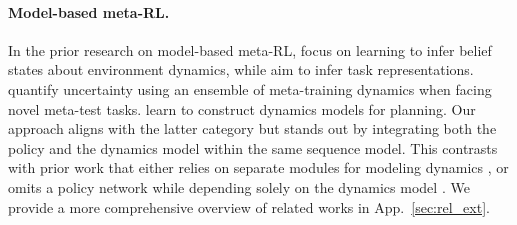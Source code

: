 \paragraph*{Model-based meta-RL.}
In the prior research on model-based meta-RL, 
\cite{VariBAD,HyperX,BOReL} focus on learning to infer belief states about environment dynamics, while \citet{MoSS} aim to infer task representations.
\citet{IDAQ} quantify uncertainty using an ensemble of meta-training dynamics when facing novel meta-test tasks.
\citet{ReBAL,TFsearch,MAMBA} learn to construct dynamics models for planning.
Our approach aligns with the latter category but stands out by integrating both the policy and the dynamics model within the same sequence model.
This contrasts with prior work that either relies on separate modules for modeling dynamics \citep{ReBAL,MAMBA}, or omits a policy network while depending solely on the dynamics model \citep{TFsearch}.
We provide a more comprehensive overview of related works in App.~\ref{sec:rel_ext}.